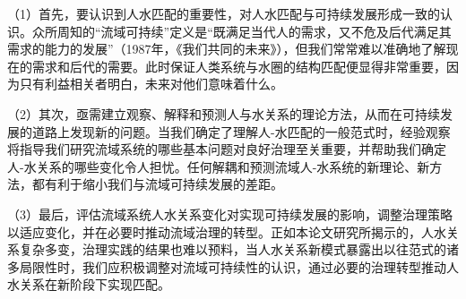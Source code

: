 （1）首先，要认识到人水匹配的重要性，对人水匹配与可持续发展形成一致的认识。众所周知的“流域可持续”定义是“既满足当代人的需求，又不危及后代满足其需求的能力的发展”（1987年，《我们共同的未来》），但我们常常难以准确地了解现在的需求和后代的需要。此时保证人类系统与水圈的结构匹配便显得非常重要，因为只有利益相关者明白，未来对他们意味着什么。

（2）其次，亟需建立观察、解释和预测人与水关系的理论方法，从而在可持续发展的道路上发现新的问题。当我们确定了理解人-水匹配的一般范式时，经验观察将指导我们研究流域系统的哪些基本问题对良好治理至关重要，并帮助我们确定人-水关系的哪些变化令人担忧。任何解耦和预测流域人-水系统的新理论、新方法，都有利于缩小我们与流域可持续发展的差距。

（3）最后，评估流域系统人水关系变化对实现可持续发展的影响，调整治理策略以适应变化，并在必要时推动流域治理的转型。正如本论文研究所揭示的，人水关系复杂多变，治理实践的结果也难以预料，当人水关系新模式暴露出以往范式的诸多局限性时，我们应积极调整对流域可持续性的认识，通过必要的治理转型推动人水关系在新阶段下实现匹配。
